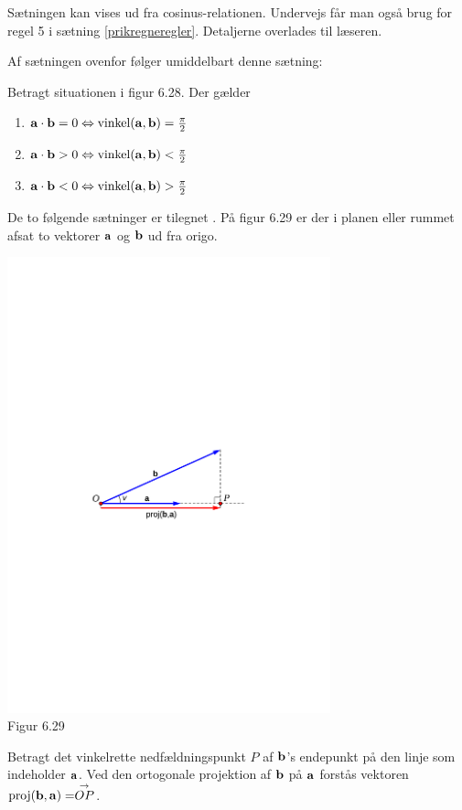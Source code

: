 \begin{bevis}
Sætningen kan vises ud fra cosinus-relationen. Undervejs får man også brug for regel 5 i sætning \ref{prikregneregler}. Detaljerne overlades til læseren.
\end{bevis}
Af sætningen ovenfor følger umiddelbart denne sætning:

\begin{corollary}
Betragt situationen i figur 6.28. Der gælder
\begin{enumerate}
\item
$\mathbf{a} \cdot \mathbf{b}=0\Leftrightarrow \mathrm{vinkel}(\mathbf{a},\mathbf{b})=\frac{\pi}{2}$
\item
$\mathbf{a} \cdot \mathbf{b} > 0\Leftrightarrow \mathrm{vinkel}(\mathbf{a},\mathbf{b})<\frac{\pi}{2}$
\item
$\mathbf{a} \cdot \mathbf{b}<0\Leftrightarrow \mathrm{vinkel}(\mathbf{a},\mathbf{b})>\frac{\pi}{2}$
\end{enumerate}
\end{corollary}

De to følgende sætninger er tilegnet . På figur 6.29 er der i planen eller rummet afsat to vektorer $\mathbf{a}$ og $\mathbf{b}$ ud fra origo.
\begin{center}
		\includegraphics[trim=1.4cm 12cm 1.4cm 12cm,width=0.70\textwidth,clip]{geometer/proj.pdf}	
		\\Figur 6.29
\end{center} 
 Betragt det vinkelrette nedfældningspunkt $P$ af $\mathbf{b}$'s endepunkt på den linje som indeholder $\mathbf{a}$. Ved den ortogonale projektion af $\mathbf{b}$ på $\mathbf{a}$ forstås vektoren $\mathrm{proj}(\mathbf{b},\mathbf{a})=\stackrel{\rightarrow}{OP}$.
 
